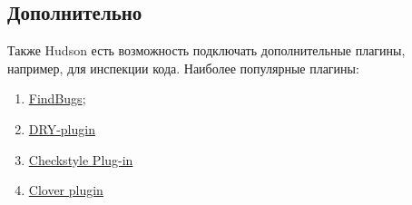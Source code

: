 \documentclass[a4paper,12pt]{article}
\begin{document}
\subsection{Дополнительно}
Также Hudson есть возможность подключать дополнительные плагины, например, для инспекции кода.
Наиболее популярные плагины:
\begin{enumerate}
  \item \href{http://findbugs.sourceforge.net/}{FindBugs}; 
  \item \href{http://wiki.hudson-ci.org/display/HUDSON/DRY+Plugin}{DRY-plugin} 
  \item \href{http://wiki.hudson-ci.org/display/HUDSON/Checkstyle+Plugin}{Checkstyle Plug-in}
  \item \href{https://www.atlassian.com/software/clover/overview}{Clover plugin}
\end{enumerate}
\end{document}
